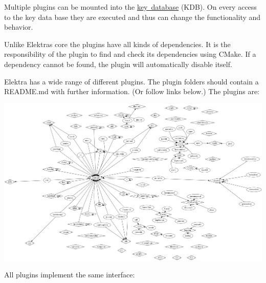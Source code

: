 Multiple plugins can be mounted into the \mbox{\hyperlink{doc_help_elektra-glossary_md}{key database}} (K\+DB). On every access to the key data base they are executed and thus can change the functionality and behavior.

Unlike Elektra\textquotesingle{}s core the plugins have all kinds of dependencies. It is the responsibility of the plugin to find and check its dependencies using C\+Make. If a dependency cannot be found, the plugin will automatically disable itself.

Elektra has a wide range of different plugins. The plugin folders should contain a R\+E\+A\+D\+M\+E.\+md with further information. (Or follow links below.) The plugins are\+:


\begin{DoxyImage}
\includegraphics[width=\textwidth,height=\textheight/2,keepaspectratio=true]{plugins.png}
\end{DoxyImage}


All plugins implement the same interface\+:


